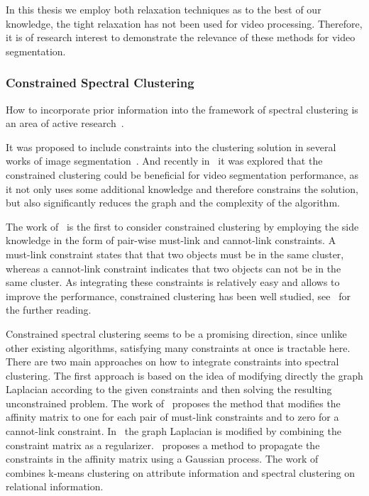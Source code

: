 In this thesis we employ both relaxation techniques as to the best of our knowledge, the tight relaxation has not been used for video processing. Therefore, it is of research interest to demonstrate the relevance of these methods 
for video segmentation.
\subsubsection*{Constrained Spectral Clustering}
How to incorporate prior information into the framework of spectral clustering is an area of active research~\cite{Kamvar03,ji06,XuLS09,WangD10,RangapuramH12}. 

It was proposed to include constraints into the clustering solution in several works of image segmentation~\cite{YuS01,ErikssonOK07,MajiVM11}.
And recently in~\cite{Galasso14} it was explored that the constrained clustering could be beneficial for video segmentation performance, as it not only uses some additional knowledge and therefore constrains the solution, 
but also significantly reduces the graph and the complexity of the algorithm. 

The work of~\cite{Wagstaff01} is the first to consider constrained clustering by 
employing the side knowledge in the form of pair-wise must-link and cannot-link constraints. A must-link constraint states that that two objects must be in the same cluster, whereas a cannot-link constraint indicates that two objects 
can not be in the same cluster. As integrating these constraints is relatively easy and allows to improve the performance, constrained clustering has been well studied, see~\cite{Basu08} for the further reading.

Constrained spectral clustering seems to be a promising direction, since unlike other existing algorithms, satisfying many constraints at once is tractable here. 
There are two main approaches on how to integrate constraints into spectral clustering. 
The first approach is based on the idea of modifying directly the graph Laplacian according to the given constraints and then solving the resulting unconstrained problem.
The work of~\cite{Kamvar03} proposes the method that modifies the affinity matrix to one for each pair of must-link constraints and to zero for a cannot-link constraint. 
In~\cite{ji06} the graph Laplacian is modified by combining the constraint matrix 
as a regularizer.~\cite{LuC08} proposes a method to propagate the constraints in the affinity matrix using a Gaussian process. 
The work of~\cite{WangDL09} combines k-means clustering on attribute information and spectral clustering on relational
information.

